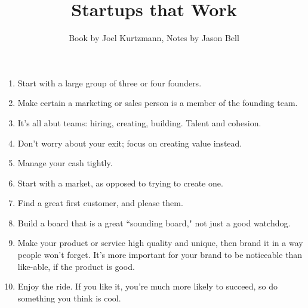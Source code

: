 \documentclass[11pt, oneside]{article}   	%
\title{Startups that Work}
\author{Book by Joel Kurtzmann, Notes by Jason Bell}
\begin{document}
\maketitle

\begin{enumerate}
\item Start with a large group of three or four founders. 
\item Make certain a marketing or sales person is a member of the founding team.
\item It's all abut teams: hiring, creating, building.  Talent and cohesion.  
\item Don't worry about your exit; focus on creating value instead.
\item Manage your cash tightly.
\item Start with a market, as opposed to trying to create one.
\item Find a great first customer, and please them.
\item Build a board that is a great ``sounding board," not just a good watchdog.
\item Make your product or service high quality and unique, then brand it in a way people won't forget.  It's more important for your brand to be noticeable than like-able, if the product is good.
\item Enjoy the ride.  If you like it, you're much more likely to succeed, so do something you think is cool.  
\end{enumerate}
\end{document}
